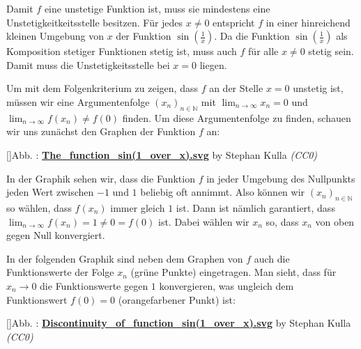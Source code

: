 \documentclass[fontsize=9pt,
               parskip=half-,
               DIV=14,
               listof=chapterentry,
               tocflat]{scrbook}
\newcounter{imagelabel}
\begin{document}
\begin{solutionprocess*}
Damit $f$ eine unstetige Funktion ist, muss sie mindestens eine Unstetigkeitkeitsstelle besitzen. Für jedes $x\neq 0$ entspricht $f$ in einer hinreichend kleinen Umgebung von $x$ der Funktion $\sin \left({\tfrac {1}{x}}\right)$. Da die Funktion $\sin \left({\tfrac {1}{x}}\right)$ als Komposition stetiger Funktionen stetig ist, muss auch $f$ für alle $x\neq 0$ stetig sein. Damit muss die Unstetigkeitsstelle bei $x=0$ liegen.

Um mit dem Folgenkriterium zu zeigen, dass $f$ an der Stelle $x=0$ unstetig ist, müssen wir eine Argumentenfolge $(x_{n})_{n\in \mathbb {N} }$ mit $\lim _{n\to \infty }x_{n}=0$ und $\lim _{n\to \infty }f(x_{n})\neq f(0)$ finden. Um diese Argumentenfolge zu finden, schauen wir uns zunächst den Graphen der Funktion $f$ an:

[]{Abb. : \protect\href{https://commons.wikimedia.org/wiki/File:The_function_sin(1_over_x).svg}{\textbf{The\allowbreak\_function\allowbreak\_sin(1\allowbreak\_over\allowbreak\_x).svg}} by Stephan Kulla \textit{(CC0)}}\begin{center}
\end{center}

In der Graphik sehen wir, dass die Funktion $f$ in jeder Umgebung des Nullpunkts jeden Wert zwischen $-1$ und $1$ beliebig oft annimmt. Also können wir $(x_{n})_{n\in \mathbb {N} }$ so wählen, dass $f(x_{n})$ immer gleich $1$ ist. Dann ist nämlich garantiert, dass $\lim _{n\to \infty }f(x_{n})=1\neq 0=f(0)$ ist. Dabei wählen wir $x_{n}$ so, dass $x_{n}$ von oben gegen Null konvergiert.

In der folgenden Graphik sind neben dem Graphen von $f$ auch die Funktionswerte der Folge $x_{n}$ (grüne Punkte) eingetragen. Man sieht, dass für $x_{n}\to 0$ die Funktionswerte gegen $1$ konvergieren, was ungleich dem Funktionswert $f(0)=0$ (orangefarbener Punkt) ist:

[]{Abb. : \protect\href{https://commons.wikimedia.org/wiki/File:Discontinuity_of_function_sin(1_over_x).svg}{\textbf{Discontinuity\allowbreak\_of\allowbreak\_function\allowbreak\_sin(1\allowbreak\_over\allowbreak\_x).svg}} by Stephan Kulla \textit{(CC0)}}\begin{center}
\end{center}


\end{solutionprocess*}
\end{document}
